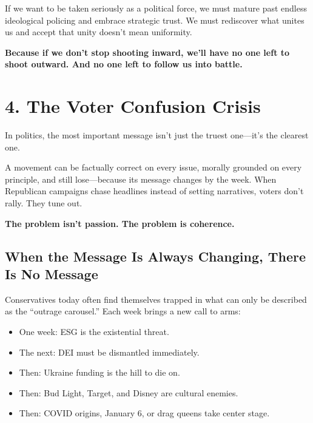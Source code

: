 If we want to be taken seriously as a political force, we must mature past endless ideological policing and embrace strategic trust. We must rediscover what unites us and accept that unity doesn’t mean uniformity.

\textbf{Because if we don’t stop shooting inward, we’ll have no one left to shoot outward. And no one left to follow us into battle.}


















\section*{4. The Voter Confusion Crisis}

In politics, the most important message isn’t just the truest one—it’s the clearest one.

A movement can be factually correct on every issue, morally grounded on every principle, and still lose—because its message changes by the week. When Republican campaigns chase headlines instead of setting narratives, voters don’t rally. They tune out.

\textbf{The problem isn’t passion. The problem is coherence.}

\subsection*{When the Message Is Always Changing, There Is No Message}

Conservatives today often find themselves trapped in what can only be described as the “outrage carousel.” Each week brings a new call to arms:

\begin{itemize}
    \item One week: ESG is the existential threat.
    \item The next: DEI must be dismantled immediately.
    \item Then: Ukraine funding is the hill to die on.
    \item Then: Bud Light, Target, and Disney are cultural enemies.
    \item Then: COVID origins, January 6, or drag queens take center stage.
\end{itemize}

